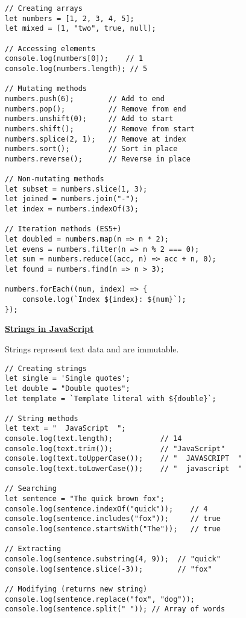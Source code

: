 \documentclass[12pt,a4paper,oneside]{book}
\newcommand{\mysection}[1]{%
    \vspace{0.3em}
    {\large\bfseries\underline{#1}}
    \vspace{0.2em}
    \addcontentsline{toc}{section}{#1}
}
\begin{document}
\begin{lstlisting}[style=javascript, caption={\textbf{Arrays - Creation and Methods}}, label=lst:arrays]
// Creating arrays
let numbers = [1, 2, 3, 4, 5];
let mixed = [1, "two", true, null];

// Accessing elements
console.log(numbers[0]);    // 1
console.log(numbers.length); // 5

// Mutating methods
numbers.push(6);        // Add to end
numbers.pop();          // Remove from end
numbers.unshift(0);     // Add to start
numbers.shift();        // Remove from start
numbers.splice(2, 1);   // Remove at index
numbers.sort();         // Sort in place
numbers.reverse();      // Reverse in place

// Non-mutating methods
let subset = numbers.slice(1, 3);
let joined = numbers.join("-");
let index = numbers.indexOf(3);

// Iteration methods (ES5+)
let doubled = numbers.map(n => n * 2);
let evens = numbers.filter(n => n % 2 === 0);
let sum = numbers.reduce((acc, n) => acc + n, 0);
let found = numbers.find(n => n > 3);

numbers.forEach((num, index) => {
    console.log(`Index ${index}: ${num}`);
});
\end{lstlisting}

\mysection{Strings in JavaScript}

Strings represent text data and are immutable.

\begin{lstlisting}[style=javascript, caption={\textbf{String Creation and Methods}}, label=lst:strings]
// Creating strings
let single = 'Single quotes';
let double = "Double quotes";
let template = `Template literal with ${double}`;

// String methods
let text = "  JavaScript  ";
console.log(text.length);           // 14
console.log(text.trim());           // "JavaScript"
console.log(text.toUpperCase());    // "  JAVASCRIPT  "
console.log(text.toLowerCase());    // "  javascript  "

// Searching
let sentence = "The quick brown fox";
console.log(sentence.indexOf("quick"));    // 4
console.log(sentence.includes("fox"));     // true
console.log(sentence.startsWith("The"));   // true

// Extracting
console.log(sentence.substring(4, 9));  // "quick"
console.log(sentence.slice(-3));        // "fox"

// Modifying (returns new string)
console.log(sentence.replace("fox", "dog"));
console.log(sentence.split(" ")); // Array of words
\end{lstlisting}
\end{document}
